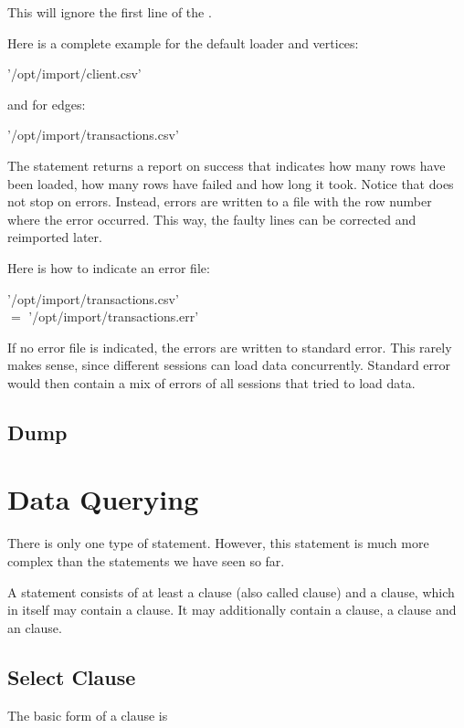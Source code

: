 
This will ignore the first line of the .

Here is a complete example for the default loader and vertices:

 '/opt/import/client.csv'
  

and for edges:

 '/opt/import/transactions.csv'
 

The  statement returns a report on success
that indicates how many rows have been loaded,
how many rows have failed and how long it took.
Notice that  does not stop on errors.
Instead, errors are written to a file
with the row number where the error occurred.
This way, the faulty lines can be corrected and
reimported later.

Here is how to indicate an error file:

 '/opt/import/transactions.csv'
  \\
\hspace*{0.3cm} $=$ '/opt/import/transactions.err'

If no error file is indicated,
the errors are written to standard error.
This rarely makes sense,
since different sessions can load data concurrently.
Standard error would then contain a mix
of errors of all sessions that tried to load data.

\subsection{Dump}

\section{Data Querying}
There is only one type of  statement.
However, this statement is much more complex
than the statements we have seen so far.

A  statement consists of at least
a  clause (also called  clause)
and a  clause, which in itself may contain
a  clause.
It may additionally contain
a  clause,
a  clause and
an  clause.

\subsection{Select Clause}
The basic form of a  clause is

